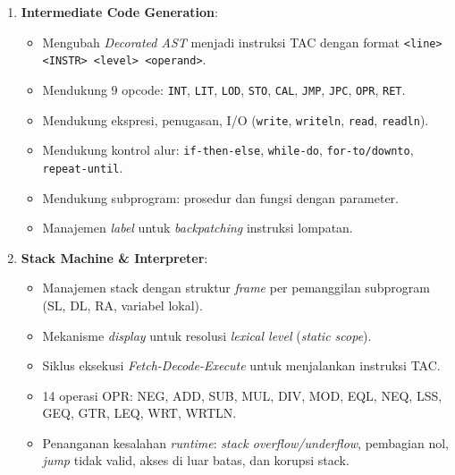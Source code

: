 \documentclass[12pt,a4paper]{article}
\begin{document}
\begin{enumerate}[label=\arabic*.]
    \item \textbf{Intermediate Code Generation}:
        \begin{itemize}
            \item Mengubah \textit{Decorated AST} menjadi instruksi TAC
                dengan format \texttt{<line> <INSTR> <level> <operand>}.
            \item Mendukung 9 opcode: \texttt{INT}, \texttt{LIT},
                \texttt{LOD}, \texttt{STO}, \texttt{CAL}, \texttt{JMP},
                \texttt{JPC}, \texttt{OPR}, \texttt{RET}.
            \item Mendukung ekspresi, penugasan, I/O (\texttt{write},
                \texttt{writeln}, \texttt{read}, \texttt{readln}).
            \item Mendukung kontrol alur: \texttt{if-then-else},
                \texttt{while-do}, \texttt{for-to/downto},
                \texttt{repeat-until}.
            \item Mendukung subprogram: prosedur dan fungsi dengan parameter.
            \item Manajemen \textit{label} untuk \textit{backpatching}
                instruksi lompatan.
        \end{itemize}
    \item \textbf{Stack Machine \& Interpreter}:
        \begin{itemize}
            \item Manajemen stack dengan struktur \textit{frame} per
                pemanggilan subprogram (SL, DL, RA, variabel lokal).
            \item Mekanisme \textit{display} untuk resolusi \textit{lexical
                level} (\textit{static scope}).
            \item Siklus eksekusi \textit{Fetch-Decode-Execute} untuk
                menjalankan instruksi TAC.
            \item 14 operasi OPR: NEG, ADD, SUB, MUL, DIV, MOD, EQL, NEQ,
                LSS, GEQ, GTR, LEQ, WRT, WRTLN.
            \item Penanganan kesalahan \textit{runtime}: \textit{stack
                overflow/underflow}, pembagian nol, \textit{jump} tidak valid,
                akses di luar batas, dan korupsi stack.
        \end{itemize}
\end{enumerate}


\end{document}
